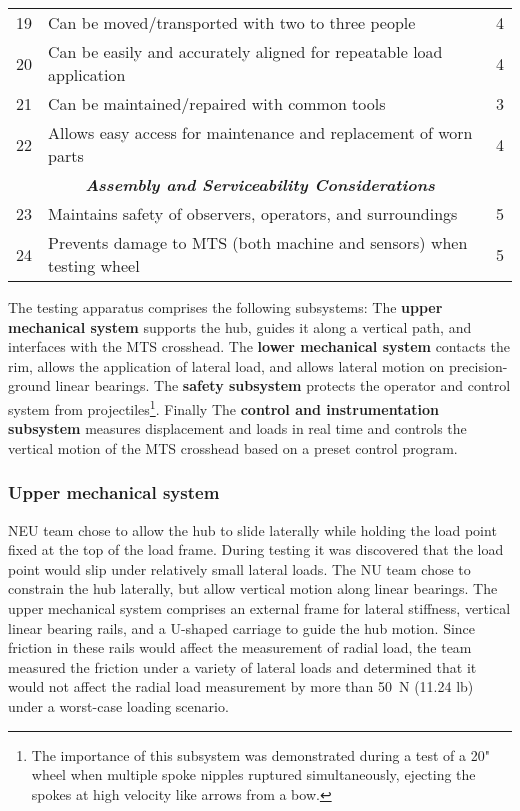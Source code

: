 \documentclass[\rootdir/thesis.tex]{subfiles}
\begin{document}
\begin{table}
\begin{tabularx}{\linewidth}{r|Xc}
\hline
19& Can be moved/transported with two to three people& 4\\
20& Can be easily and accurately aligned for repeatable load application& 4\\
21& Can be maintained/repaired with common tools& 3\\
22& Allows easy access for maintenance and replacement of worn parts& 4\\
\hline
\multicolumn{3}{c}{\emph{\textbf{Assembly and Serviceability Considerations}}}\\
\hline
23& Maintains safety of observers, operators, and surroundings& 5\\
24& Prevents damage to MTS (both machine and sensors) when testing wheel& 5\\
\hline
\end{tabularx}
\end{table}

The testing apparatus comprises the following subsystems: The \textbf{upper mechanical system} supports the hub, guides it along a vertical path, and interfaces with the MTS crosshead. The \textbf{lower mechanical system} contacts the rim, allows the application of lateral load, and allows lateral motion on precision-ground linear bearings. The \textbf{safety subsystem} protects the operator and control system from projectiles\footnote{The importance of this subsystem was demonstrated during a test of a 20" wheel when multiple spoke nipples ruptured simultaneously, ejecting the spokes at high velocity like arrows from a bow.}. Finally The \textbf{control and instrumentation subsystem} measures displacement and loads in real time and controls the vertical motion of the MTS crosshead based on a preset control program.

\subsubsection{Upper mechanical system}

NEU team chose to allow the hub to slide laterally while holding the load point fixed at the top of the load frame. During testing it was discovered that the load point would slip under relatively small lateral loads. The NU team chose to constrain the hub laterally, but allow vertical motion along linear bearings. The upper mechanical system comprises an external frame for lateral stiffness, vertical linear bearing rails, and a U-shaped carriage to guide the hub motion. Since friction in these rails would affect the measurement of radial load, the team measured the friction under a variety of lateral loads and determined that it would not affect the radial load measurement by more than \SI{50}{\newton} (11.24 lb) under a worst-case loading scenario.
\end{document}

